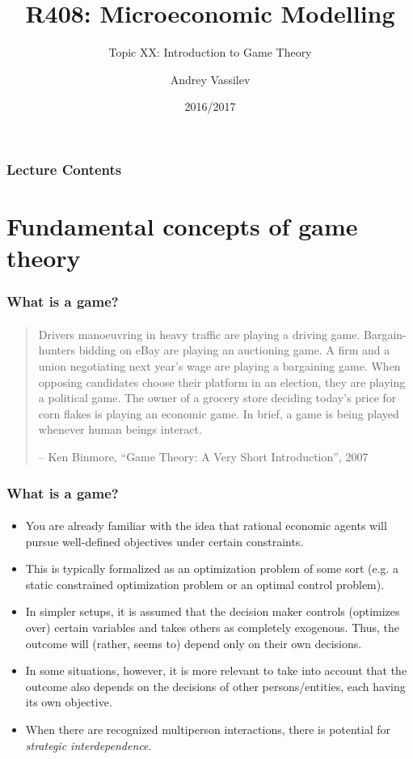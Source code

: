\documentclass[10pt]{beamer}
\title{R408: Microeconomic Modelling}
\subtitle{Topic XX: \textcolor{myred}{Introduction to Game Theory}}
\author{Andrey Vassilev}
\date{2016/2017}
\theoremstyle{definition}
\begin{document}
\maketitle

\begin{frame}[fragile]
\frametitle{Lecture Contents}
\tableofcontents
\end{frame} 

\section{Fundamental concepts of game theory}


\begin{frame}[fragile]
\frametitle{What is a game?}
\framesubtitle{}
\begin{quote}
Drivers manoeuvring in heavy traffic are playing a driving game.
Bargain-hunters bidding on eBay are playing an auctioning game.
A firm and a union negotiating next year's wage are playing a
bargaining game. When opposing candidates choose their
platform in an election, they are playing a political game. The
owner of a grocery store deciding today's price for corn flakes is
playing an economic game. In brief, a game is being played
whenever human beings interact.

\begin{flushright}
-- Ken Binmore, ``Game Theory: A Very Short Introduction'', 2007
\end{flushright}
\end{quote}
\end{frame}



\begin{frame}[fragile]
\frametitle{What is a game?}
\framesubtitle{}
\begin{itemize}\itemsep1em
\item You are already familiar with the idea that rational economic agents will pursue well-defined objectives under certain constraints.
\item This is typically formalized as an optimization problem of some sort (e.g. a static constrained optimization problem or an optimal control problem).
\item In simpler setups, it is assumed that the decision maker controls (optimizes over) certain variables and takes others as completely exogenous. Thus, the outcome will (rather, seems to) depend only on their own decisions.
\item In some situations, however, it is more relevant to take into account that the outcome also depends on the decisions of other persons/entities, each having its own objective.
\item When there are recognized multiperson interactions, there is potential for \emph{strategic interdependence}.
\end{itemize}
\end{frame}
\end{document}
